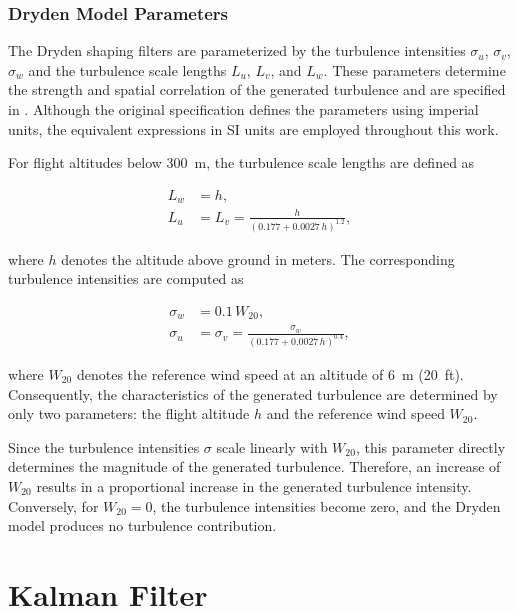 \subsubsection{Dryden Model Parameters}
\label{sec:2.3.2DrydenParams}

The Dryden shaping filters are parameterized by the turbulence intensities $\sigma_u$, $\sigma_v$, $\sigma_w$ and the turbulence scale lengths $L_u$, $L_v$, and $L_w$. These parameters determine the strength and spatial correlation of the generated turbulence and are specified in \cite{MILF8785C}. Although the original specification defines the parameters using imperial units, the equivalent expressions in SI units are employed throughout this work.

For flight altitudes below \SI{300}{m}, the turbulence scale lengths are defined as

\begin{align}
	L_w &= h, \\
	L_u &= L_v = \frac{h}{\left(0.177 + 0.0027\,h\right)^{1.2}},	
\end{align}

where $h$ denotes the altitude above ground in meters.
The corresponding turbulence intensities are computed as

\begin{align}
	\sigma_w &= 0.1\,W_{20}, \\
	\sigma_u &= \sigma_v =
	\frac{\sigma_w}{\left(0.177 + 0.0027\,h\right)^{0.4}},
\end{align}

where $W_{20}$ denotes the reference wind speed at an altitude of \SI{6}{m} (\SI{20}{ft}). Consequently, the characteristics of the generated turbulence are determined by only two parameters: the flight altitude $h$ and the reference wind speed $W_{20}$. 

Since the turbulence intensities $\sigma$ scale linearly with $W_{20}$, this parameter directly determines the magnitude of the generated turbulence. Therefore, an increase of $W_{20}$ results in a proportional increase in the generated turbulence intensity. Conversely, for $W_{20}=0$, the turbulence intensities become zero, and the Dryden model produces no turbulence contribution.





\section{Kalman Filter}
\label{sec:2.4KalmanFilter}

